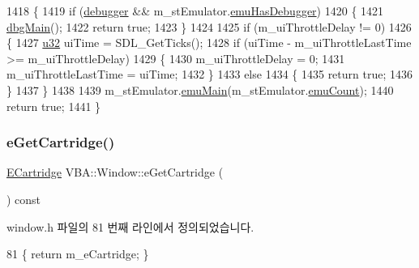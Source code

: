\begin{DoxyCode}
1418 \{
1419   \textcolor{keywordflow}{if} (\mbox{\hyperlink{windowcallbacks_8cpp_af67e2df4c66ef114f4edb85c06810007}{debugger}} && m\_stEmulator.\mbox{\hyperlink{struct_emulated_system_a3c90818d1108c9f7370a388419344362}{emuHasDebugger}})
1420   \{
1421     \mbox{\hyperlink{windowcallbacks_8cpp_a2a73601d4d24ff6d902f4e6b4c7b06fe}{dbgMain}}();
1422     \textcolor{keywordflow}{return} \textcolor{keyword}{true};
1423   \}
1424 
1425   \textcolor{keywordflow}{if} (m\_uiThrottleDelay != 0)
1426   \{
1427     \mbox{\hyperlink{_system_8h_a10e94b422ef0c20dcdec20d31a1f5049}{u32}} uiTime = SDL\_GetTicks();
1428     \textcolor{keywordflow}{if} (uiTime - m\_uiThrottleLastTime >= m\_uiThrottleDelay)
1429     \{
1430       m\_uiThrottleDelay = 0;
1431       m\_uiThrottleLastTime = uiTime;
1432     \}
1433     \textcolor{keywordflow}{else}
1434     \{
1435       \textcolor{keywordflow}{return} \textcolor{keyword}{true};
1436     \}
1437   \}
1438 
1439   m\_stEmulator.\mbox{\hyperlink{struct_emulated_system_a7ff4d7f593baf3463709ea72a6c4a20b}{emuMain}}(m\_stEmulator.\mbox{\hyperlink{struct_emulated_system_a4241c0057d935ae757508f26be9b37ad}{emuCount}});
1440   \textcolor{keywordflow}{return} \textcolor{keyword}{true};
1441 \}
\end{DoxyCode}
\mbox{\label{class_v_b_a_1_1_window_aed86700e3c983d6858c24e48eea48710}} 
\subsubsection{\texorpdfstring{e\+Get\+Cartridge()}{eGetCartridge()}}
{\footnotesize\ttfamily \mbox{\hyperlink{class_v_b_a_1_1_window_af580451d3ee7a738a73434858a08fa65}{E\+Cartridge}} V\+B\+A\+::\+Window\+::e\+Get\+Cartridge (\begin{DoxyParamCaption}{ }\end{DoxyParamCaption}) const\hspace{0.3cm}{\ttfamily [inline]}}



window.\+h 파일의 81 번째 라인에서 정의되었습니다.


\begin{DoxyCode}
81 \{ \textcolor{keywordflow}{return} m\_eCartridge; \}
\end{DoxyCode}
\mbox{\label{class_v_b_a_1_1_window_a1f6599f43eda534897aa9aea53a840a0}} 
